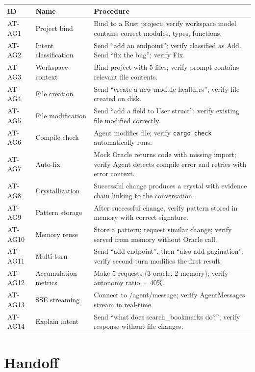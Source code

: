 \documentclass[11pt,a4paper,twoside]{article}
\theoremstyle{definition}
\theoremstyle{remark}
\begin{document}
\begin{longtable}{l l p{5.5cm}}
\toprule
\textbf{ID} & \textbf{Name} & \textbf{Procedure} \\
\midrule
\endfirsthead \midrule \endhead \bottomrule \endfoot
AT-AG1 & Project bind & Bind to a Rust project; verify workspace
  model contains correct modules, types, functions. \\
AT-AG2 & Intent classification & Send ``add an endpoint''; verify
  classified as Add. Send ``fix the bug''; verify Fix. \\
AT-AG3 & Workspace context & Bind project with 5 files; verify
  prompt contains relevant file contents. \\
AT-AG4 & File creation & Send ``create a new module health.rs'';
  verify file created on disk. \\
AT-AG5 & File modification & Send ``add a field to User struct'';
  verify existing file modified correctly. \\
AT-AG6 & Compile check & Agent modifies file; verify
  \texttt{cargo check} automatically runs. \\
AT-AG7 & Auto-fix & Mock Oracle returns code with missing import;
  verify Agent detects compile error and retries with error context. \\
AT-AG8 & Crystallization & Successful change produces a crystal
  with evidence chain linking to the conversation. \\
AT-AG9 & Pattern storage & After successful change, verify pattern
  stored in memory with correct signature. \\
AT-AG10 & Memory reuse & Store a pattern; request similar change;
  verify served from memory without Oracle call. \\
AT-AG11 & Multi-turn & Send ``add endpoint'', then ``also add
  pagination''; verify second turn modifies the first result. \\
AT-AG12 & Accumulation metrics & Make 5 requests (3 oracle, 2 memory);
  verify autonomy ratio = 40\%. \\
AT-AG13 & SSE streaming & Connect to /agent/message; verify
  AgentMessages stream in real-time. \\
AT-AG14 & Explain intent & Send ``what does search\_bookmarks do?'';
  verify response without file changes. \\
\end{longtable}


\part{Handoff}\label{part:handoff}
\end{document}
